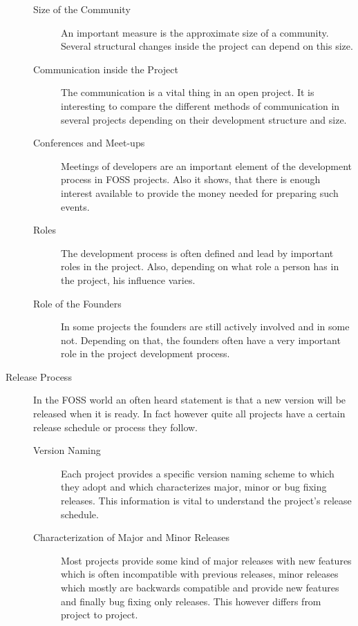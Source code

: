 \begin{description}
  \begin{description}

    \item[Size of the Community] An important measure is the approximate size
      of a community. Several structural changes inside the project can depend
      on this size.

    \item[Communication inside the Project] The communication is a vital thing
      in an open project. It is interesting to compare the different methods of
      communication in several projects depending on their development
      structure and size.

    \item[Conferences and Meet-ups] Meetings of developers are an important
      element of the development process in FOSS projects. Also it shows, that
      there is enough interest available to provide the money needed for
      preparing such events.

    \item[Roles] The development process is often defined and lead by important
      roles in the project. Also, depending on what role a person has in the
      project, his influence varies. 

    \item[Role of the Founders] In some projects the founders are still
      actively involved and in some not. Depending on that, the founders often
      have a very important role in the project development process.

  \end{description}

  \item[Release Process] In the FOSS world an often heard statement is that a
    new version will be released when it is ready. In fact however quite all
    projects have a certain release schedule or process they follow.

  \begin{description}

    \item[Version Naming] Each project provides a specific version naming
      scheme to which they adopt and which characterizes major, minor or bug
      fixing releases. This information is vital to understand the project's
      release schedule.

    \item[Characterization of Major and Minor Releases] Most projects provide
      some kind of major releases with new features which is often incompatible
      with previous releases, minor releases which mostly are backwards
      compatible and provide new features and finally bug fixing only releases.
      This however differs from project to project.


\end{description}
\end{description}

